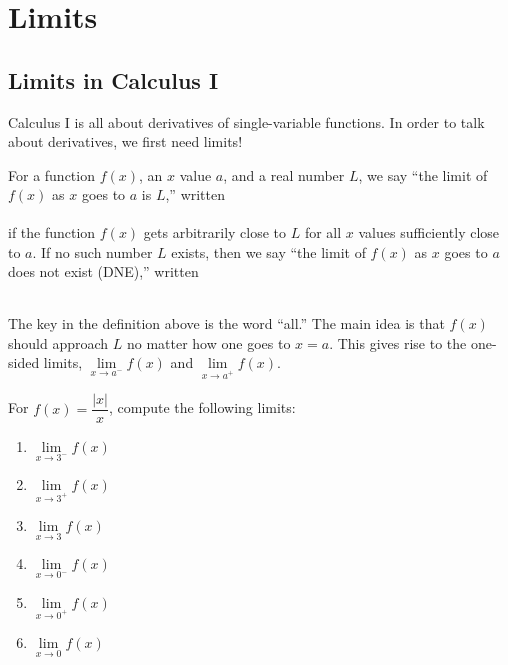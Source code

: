 \newlecture
\setcounter{chapter}{10}
\setcounter{section}{0}

\def\coursetopicnumber{II}
\def\topic{Limits} %
\def\shorttopic{Limits} %
\def\textbookname{Active Calculus} %
\def\shorttextbookname{AC} %
\def\textbooksection{10.1} %
\def\textbooksectionurl{https://activecalculus.org/vector/S-10-1-Limits.html} %
\def\handoutday{} %



\thispagestyle{plain}
\topstuff
\section{\topic{} \booklink{}}
\label{sec:limits}
\subsection{Limits in Calculus I}
Calculus I is all about derivatives of single-variable functions. In order to talk about derivatives, we first need limits!

\begin{defn}[Limit]
    For a function $f(x)$, an $x$ value $a$, and a real number $L$, we say ``the limit of $f(x)$ as $x$ goes to $a$ is $L$,'' written 
    \[
        \phantom{\lim\limits_{x\to a}f(x)=L,}
    \] 
    if the function $f(x)$ gets arbitrarily close to $L$ for all $x$ values sufficiently close to $a$. If no such number $L$ exists, then we say ``the limit of $f(x)$ as $x$ goes to $a$ does not exist (DNE),'' written 
    \[
        \phantom{\lim\limits_{x\to a}f(x) \text{ DNE.}}
    \]
\end{defn}

The key in the definition above is the word ``all.'' The main idea is that $f(x)$ should approach $L$ no matter how one goes to $x=a$. This gives rise to the one-sided limits, $\lim\limits_{x\to a^-}f(x)$ and $\lim\limits_{x\to a^+}f(x)$.

\vspace{.6in}

\begin{ex}
    For $f(x)=\dfrac{|x|}{x}$, compute the following limits:
    \begin{enumerate}
        \item $\lim\limits_{x\to 3^-} f(x)$
        \item $\lim\limits_{x\to 3^+} f(x)$
        \item $\lim\limits_{x \to 3}  f(x)$
        \item $\lim\limits_{x\to 0^-} f(x)$
        \item $\lim\limits_{x\to 0^+} f(x)$
        \item $\lim\limits_{x \to 0}  f(x)$
    \end{enumerate}
\end{ex}

